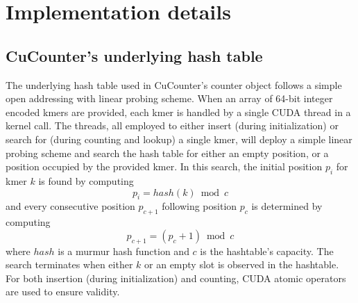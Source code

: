 \section*{Implementation details}

\subsection*{CuCounter's underlying hash table}
The underlying hash table used in CuCounter's counter object follows a simple open addressing with linear probing scheme.
When an array of 64-bit integer encoded kmers are provided, each kmer is handled by a single CUDA thread in a kernel call.
The threads, all employed to either insert (during initialization) or search for (during counting and lookup) a single kmer, will deploy a simple linear probing scheme and search the hash table for either an empty position, or a position occupied by the provided kmer.
In this search, the initial position $p_i$ for kmer $k$ is found by computing
\begin{equation}
  p_i=hash(k) \bmod c
\end{equation}
and every consecutive position $p_{c+1}$ following position $p_c$ is determined by computing
\begin{equation}
  p_{c+1}=(p_c+1) \bmod c
\end{equation}
where $hash$ is a murmur hash function and $c$ is the hashtable's capacity.
The search terminates when either $k$ or an empty slot is observed in the hashtable.
For both insertion (during initialization) and counting, CUDA atomic operators are used to ensure validity.
